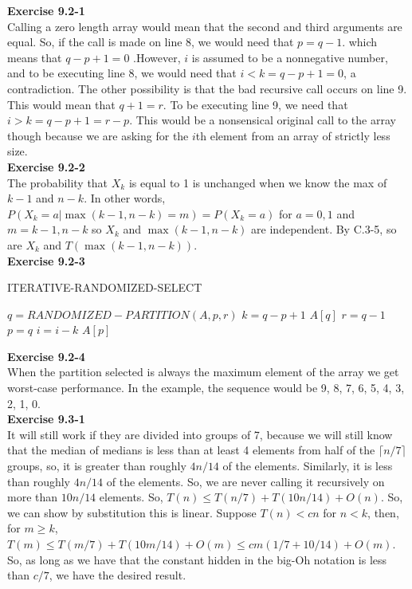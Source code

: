 \documentclass{article}
\begin{document}
\noindent\textbf{ Exercise 9.2-1} \\
Calling a zero length array would mean that the second and third arguments are equal. So, if the call is made on line 8, we would need that $p=q-1$. which means that $q-p+1=0$ .However, $i$ is assumed to be a nonnegative number, and to be executing line 8, we would need that $i < k = q-p+1=0$, a contradiction. The other possibility is that the bad recursive call occurs on line 9. This would mean that $q+1=r$. To be executing line 9, we need that $i>k = q-p+1 = r-p$. This would be a nonsensical original call to the array though because we are asking for the $i$th element from an array of strictly less size. \\

\noindent\textbf{Exercise 9.2-2}\\

The probability that $X_k$ is equal to 1 is unchanged when we know the max of $k-1$ and $n-k$.  In other words, $P(X_k = a | \max(k-1, n-k) = m) = P(X_k = a)$ for $a=0,1$ and $m=k-1, n-k$ so $X_k$ and $\max(k-1, n-k)$ are independent. By C.3-5, so are $X_k$ and $T(\max(k-1, n-k))$. \\

\noindent\textbf{ Exercise 9.2-3} \\
\begin{algorithm}
\caption{ ITERATIVE-RANDOMIZED-SELECT}
\begin{algorithmic}
\State $q = RANDOMIZED-PARTITION(A,p,r)$
\State $k=q-p+1$
\State \Return $A[q]$
\EndIf
{}
\State $r = q-1$
\Else
\State $p=q$
\State $i=i-k$
\EndIf
\EndWhile
\State \Return $A[p]$

\end{algorithmic}
\end{algorithm}

\noindent\textbf{Exercise 9.2-4}\\

When the partition selected is always the maximum element of the array we get worst-case performance.  In the example, the sequence would be 9, 8, 7, 6, 5, 4, 3, 2, 1, 0. \\

\noindent\textbf{ Exercise 9.3-1} \\
It will still work if they are divided into groups of 7, because we will still know that the median of medians is less than at least 4 elements from half of the $\lceil n/7 \rceil$ groups, so, it is greater than roughly $4n/14$ of the elements. Similarly, it is less than roughly $4n/14$ of the elements. So, we are never calling it recursively on more than $10n/14$ elements. So, $T(n) \le T(n/7) + T(10n/14)+O(n)$. So, we can show by substitution this is linear. Suppose $T(n) < cn$ for $n<k$, then, for $m\ge k$, $T(m) \le T(m/7) + T(10m/14) + O(m) \le cm(1/7+10/14) + O(m)$. So, as long as we have that the constant hidden in the big-Oh notation is less than $c/7$, we have the desired result.\\
\end{document}
